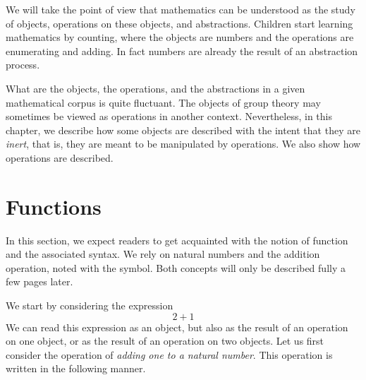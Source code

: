 \label{ch:prog}

% 
% 

We will take the point of view that mathematics can be understood as
the study of objects, operations on these objects, and abstractions.  
Children start learning mathematics by counting, where the objects are
numbers and the operations are enumerating and adding.  In fact
numbers are already the result of an abstraction process.

What are the objects, the operations, and the abstractions in a given
mathematical corpus is quite fluctuant.  The objects of group theory
may sometimes be viewed as operations in another context.  Nevertheless,
in this chapter, we describe how some objects are described with the intent
that they are {\em inert}, that is, they are meant to be
manipulated by operations.  We also show how operations are described.

\section{Functions}
In this section, we expect readers to get acquainted with the notion
of function and the associated syntax.  We rely on natural
numbers and the addition operation, noted with the \C{+} symbol.
Both concepts will only be described fully a few pages later.

We start by considering the expression
\[ 2 + 1 \]
We can read this expression as an object, but also as the result of an
operation on one object, or as the result of an operation on two
objects.  Let us first consider the operation of {\em adding one to
a natural number}.  This operation is written in the following manner.

